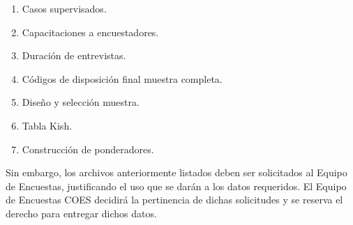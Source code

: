 \documentclass[
]{book}
\providecommand{\tightlist}{%
  \setlength{\itemsep}{0pt}\setlength{\parskip}{0pt}}
\begin{document}
\begin{enumerate}
\def\labelenumi{\arabic{enumi}.}
\tightlist
\item
  Casos supervisados.
\item
  Capacitaciones a encuestadores.
\item
  Duración de entrevistas.
\item
  Códigos de disposición final muestra completa.
\item
  Diseño y selección muestra.
\item
  Tabla Kish.
\item
  Construcción de ponderadores.
\end{enumerate}

Sin embargo, los archivos anteriormente listados deben ser solicitados al Equipo de Encuestas, justificando el uso que se darán a los datos requeridos. El Equipo de Encuestas COES decidirá la pertinencia de dichas solicitudes y se reserva el derecho para entregar dichos datos.
\end{document}
